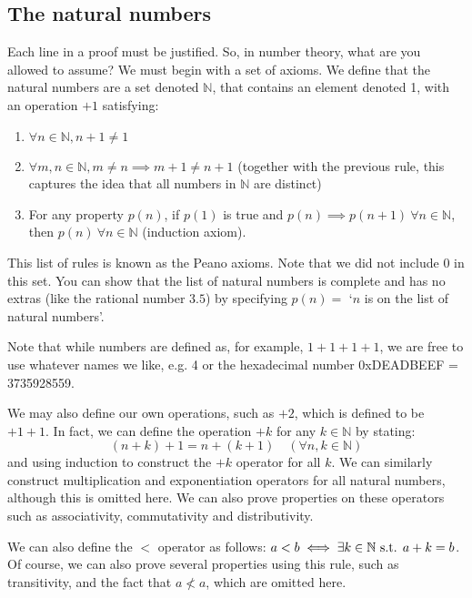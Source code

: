 \subsection{The natural numbers}
Each line in a proof must be justified.
So, in number theory, what are you allowed to assume?
We must begin with a set of axioms.
We define that the natural numbers are a set denoted \(\mathbb N\), that contains an element denoted 1, with an operation \(+1\) satisfying:
\begin{enumerate}
	\item \(\forall n \in \mathbb N, n + 1 \neq 1\)
	\item \(\forall m,n \in \mathbb N, m \neq n \implies m+1 \neq n+1\) (together with the previous rule, this captures the idea that all numbers in \(\mathbb N\) are distinct)
	\item For any property \(p(n)\), if \(p(1)\) is true and \(p(n) \implies p(n+1) \ \forall n \in \mathbb N\), then \(p(n) \ \forall n \in \mathbb N\) (induction axiom).
\end{enumerate}

\noindent This list of rules is known as the Peano axioms.
Note that we did not include 0 in this set.
You can show that the list of natural numbers is complete and has no extras (like the rational number \(3.5\)) by specifying \(p(n)=\) `\(n\) is on the list of natural numbers'.

Note that while numbers are defined as, for example, \(1+1+1+1\), we are free to use whatever names we like, e.g.
4 or the hexadecimal number 0xDEADBEEF = 3735928559.

We may also define our own operations, such as \(+2\), which is defined to be \(+1+1\).
In fact, we can define the operation \(+k\) for any \(k \in \mathbb N\) by stating:
\[
	(n+k)+1 = n+(k+1) \quad(\forall n, k \in \mathbb N)
\]
\noindent and using induction to construct the \(+k\) operator for all \(k\).
We can similarly construct multiplication and exponentiation operators for all natural numbers, although this is omitted here.
We can also prove properties on these operators such as associativity, commutativity and distributivity.

We can also define the \(<\) operator as follows: \(a < b \iff \exists k \in \mathbb N \text{ s.t. } a + k = b\).
Of course, we can also prove several properties using this rule, such as transitivity, and the fact that \(a \nless a\), which are omitted here.

